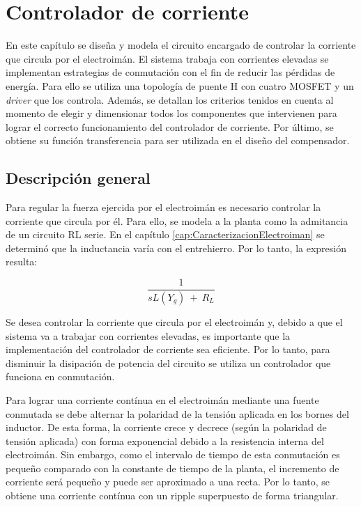 \chapter{Controlador de corriente}  \label{cap:ControladorCorriente}

En este capítulo se diseña y modela el circuito encargado de controlar la corriente que circula por el electroimán. El sistema trabaja con corrientes elevadas se implementan estrategias de conmutación con el fin de reducir las pérdidas de energía. Para ello se utiliza una topología de puente H con cuatro MOSFET y un \textsl{driver} que los controla. Además, se detallan los criterios tenidos en cuenta al momento de  elegir  y dimensionar todos los componentes que intervienen para lograr el correcto funcionamiento del controlador de corriente. Por último, se obtiene su función transferencia  para ser utilizada en el diseño del compensador.

\section{Descripción general}

\noindent Para regular la fuerza ejercida por el electroimán es necesario controlar la corriente que circula por él. Para ello, se modela a la planta como la admitancia de un circuito RL serie. En el capítulo \ref{cap:CaracterizacionElectroiman} se determinó que la inductancia varía con el entrehierro. Por lo tanto, la expresión resulta: 

\begin{equation} \label{eq_admitancia}
	\frac{1}{sL(Y_g)\ +\ R_L}
\end{equation}

\noindent Se desea controlar la corriente que circula por el electroimán y, debido a que el sistema va a trabajar con corrientes elevadas, es importante que la implementación del controlador de corriente sea eficiente. Por lo tanto, para disminuir la disipación de potencia del circuito se utiliza un controlador que funciona en conmutación. 

\noindent Para lograr una corriente contínua en el electroimán mediante una fuente conmutada se debe alternar la polaridad de la tensión aplicada en los bornes del inductor. De esta forma, la corriente crece y decrece (según la polaridad de tensión aplicada) con forma exponencial debido a la resistencia interna del electroimán. Sin embargo, como el intervalo de tiempo de esta conmutación es pequeño comparado con la constante de tiempo de la planta, el incremento de corriente será pequeño y puede ser aproximado a una recta. Por lo tanto, se obtiene una corriente contínua con un ripple superpuesto de forma triangular. 

